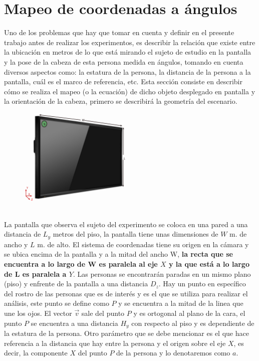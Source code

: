     \section{Mapeo de coordenadas a ángulos}
    Uno de los problemas que hay que tomar en cuenta y definir en el presente trabajo antes de realizar los experimentos, es describir la relación que existe entre la ubicación en metros de lo que está mirando el sujeto de estudio en la pantalla y la pose de la cabeza de esta persona medida en ángulos, tomando en cuenta diversos aspectos como: la estatura de la persona, la distancia de la persona a la pantalla, cuál es el marco de referencia, etc. Esta sección consiste en describir cómo se realiza el mapeo (o la ecuación) de dicho objeto desplegado en pantalla y la orientación de la cabeza, primero se describirá la geometría del escenario. 
    \begin{figure}[htbp]
    	\centering
    	\includegraphics[width=0.5\textwidth]{./pictures/pantalla2}
    	\caption{}\label{fig: figura}
    \end{figure}   
    \\La pantalla que observa el sujeto del experimento se coloca en una pared a una distancia de $L_y$ metros del piso, la pantalla tiene unas dimensiones de $W$ m. de ancho y $L$ m. de alto. El sistema de coordenadas tiene su origen en la cámara y se ubica  encima de la pantalla y a la mitad del ancho W, \textbf{la recta que se encuentra a lo largo de W es paralela al eje $X$ y la que está a lo largo de L es paralela a $Y$}. Las personas se encontrarán paradas en un mismo plano (piso) y enfrente de la pantalla a una distancia $D_z$. Hay un punto en específico del rostro de las personas que es de interés y es el que se utiliza para realizar el análisis, este punto se define como $P$ y se encuentra a la mitad de la linea que une los ojos. El vector $\vec v$ sale del punto $P$ y es ortogonal al plano de la cara, el punto $P$ se encuentra a una distancia $H_y$ con respecto al piso y es dependiente de la estatura de la persona. Otro parámetro que se debe mencionar es el que hace referencia a la distancia que hay entre la persona y el origen sobre el eje $X$, es decir, la componente $X$ del punto $P$ de la persona y lo denotaremos como $a$.%
